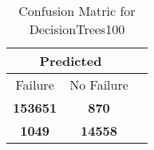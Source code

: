 \begin{table}[] 
\caption{Confusion Matric for DecisionTrees100} 
\label{Table: Prediction Accuracy-NoneDecisionTrees100100.0EKF-ignoreReflection-Reflection} 
\centering 
\begin{tabular} 
 {@{}ccc@{}} 
\toprule 
\multicolumn{2}{c}{\textbf{Predicted}}
 \\ \midrule 
\multicolumn{1}{|c|}{Failure} & 
\multicolumn{1}{c|}{No Failure}
 \\ \midrule 
\multicolumn{1}{|c|}{\color{green}\textbf{153651}} & 
\multicolumn{1}{c|}{\color{red}\textbf{870}}
 \\ \midrule 
\multicolumn{1}{|c|}{\color{red}\textbf{1049}} & 
\multicolumn{1}{c|}{\color{green}\textbf{14558}}
 \\ \bottomrule 
\end{tabular} 
\end{table} 
